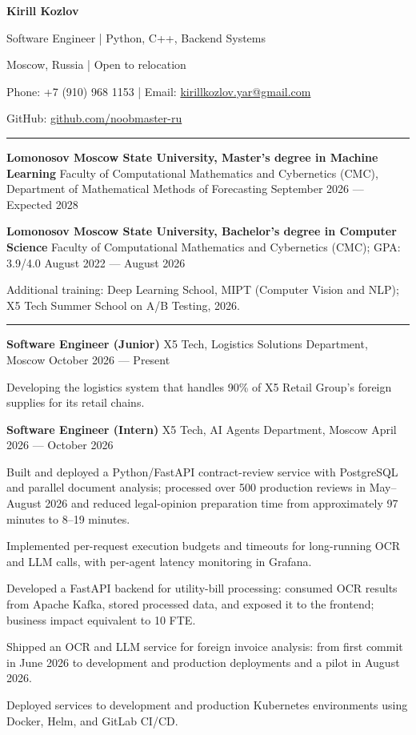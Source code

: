 \documentclass[10pt,a4paper]{article}
\newcommand{\cvsection}[1]{%
  \vspace{5pt}{\large\bfseries #1}\par\vspace{2pt}\hrule\vspace{3pt}}
\newcommand{\cventry}[3]{%
  \textbf{#1} \textbar{} #3 \textbar{} #2\par\vspace{1pt}}
\begin{document}
{\LARGE\bfseries Kirill Kozlov}\par\vspace{3pt}
Software Engineer | Python, C++, Backend Systems\par\vspace{3pt}
Moscow, Russia | Open to relocation\par
Phone: +7 (910) 968 1153 | Email: \href{mailto:kirillkozlov.yar@gmail.com}{kirillkozlov.yar@gmail.com}\par
GitHub: \href{https://github.com/noobmaster-ru}{github.com/noobmaster-ru}

\cvsection{Education}
\cventry{Lomonosov Moscow State University, Master's degree in Machine Learning}{September 2026 --- Expected 2028}{Faculty of Computational Mathematics and Cybernetics (CMC), Department of Mathematical Methods of Forecasting}
\vspace{2pt}
\cventry{Lomonosov Moscow State University, Bachelor's degree in Computer Science}{August 2022 --- August 2026}{Faculty of Computational Mathematics and Cybernetics (CMC); GPA: 3.9/4.0}
\begin{cvitems}
    \item Additional training: Deep Learning School, MIPT (Computer Vision and NLP); X5 Tech Summer School on A/B Testing, 2026.
\end{cvitems}

\cvsection{Work Experience}
\cventry{Software Engineer (Junior)}{October 2026 --- Present}{X5 Tech, Logistics Solutions Department, Moscow}
\begin{cvitems}
    \item Developing the logistics system that handles 90\% of X5 Retail Group's foreign supplies for its retail chains.
\end{cvitems}
\vspace{2pt}
\cventry{Software Engineer (Intern)}{April 2026 --- October 2026}{X5 Tech, AI Agents Department, Moscow}
\begin{cvitems}
    \item Built and deployed a Python/FastAPI contract-review service with PostgreSQL and parallel document analysis; processed over 500 production reviews in May--August 2026 and reduced legal-opinion preparation time from approximately 97 minutes to 8--19 minutes.
    \item Implemented per-request execution budgets and timeouts for long-running OCR and LLM calls, with per-agent latency monitoring in Grafana.
    \item Developed a FastAPI backend for utility-bill processing: consumed OCR results from Apache Kafka, stored processed data, and exposed it to the frontend; business impact equivalent to 10 FTE.
    \item Shipped an OCR and LLM service for foreign invoice analysis: from first commit in June 2026 to development and production deployments and a pilot in August 2026.
    \item Deployed services to development and production Kubernetes environments using Docker, Helm, and GitLab CI/CD.
\end{cvitems}
\end{document}
